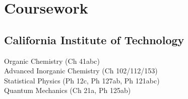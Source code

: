 \documentclass[letterpaper]{deedy-resume} %
\begin{document}
\begin{minipage}[t]{0.39\textwidth}
\section{Coursework}

\subsection{California Institute of \newline Technology}
Organic Chemistry (Ch 41abc)\\
Advanced Inorganic Chemistry (Ch 102/112/153)\\
Statistical Physics (Ph 12c, Ph 127ab, Ph 121abc)\\
Quantum Mechanics (Ch 21a, Ph 125ab)\\

\sectionspace 








\end{minipage}
\end{document}
